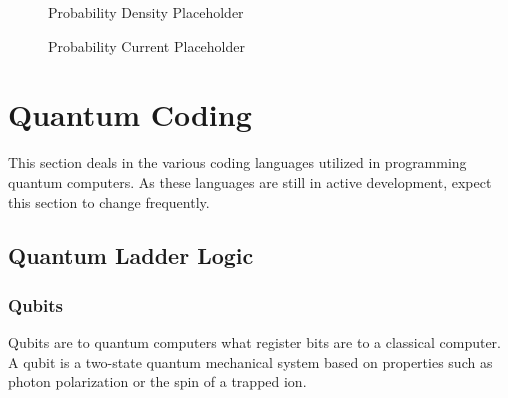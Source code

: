 \documentclass[a4paper]{article}
\begin{document}
\begin{figure} %
	\caption{Probability Density Placeholder}\label{ProbDensity1}
\end{figure}


\begin{figure} %
\caption{Probability Current Placeholder}\label{ProbCurrent1}
\end{figure}


\newpage %

\section{Quantum Coding}
This section deals in the various coding languages utilized in programming quantum computers.  As these languages are still in active development, expect this section to change frequently.

\subsection{Quantum Ladder Logic}
\label{QladderLogicHere} %
\subsubsection{Qubits} %
\label{Qubits}
Qubits are to quantum computers what register bits are to a classical computer. A qubit is a two-state quantum mechanical system based on properties such as photon polarization or the spin of a trapped ion.  
\end{document}
